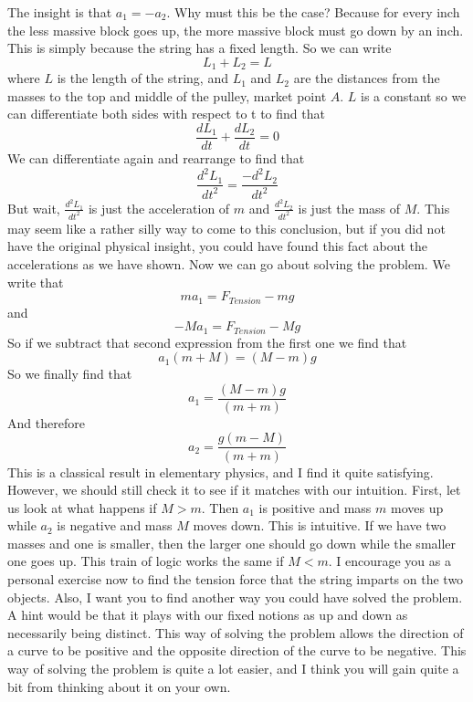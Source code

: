 \documentclass{article}[gray]
\numberwithin{equation}{subsection}
\begin{document}
The insight is that $a_1=-a_2$. Why must this be the case? Because for every inch the less massive block goes up, the more massive block must go down by an inch. This is simply because the string has a fixed length. So we can write \begin{equation}L_1+L_2=L\end{equation}where $L$ is the length of the string, and $L_1$ and $L_2$ are the distances from the masses to the top and middle of the pulley, market point $A$. $L$ is a constant so we can differentiate both sides with respect to t to find that \begin{equation}\frac{dL_1}{dt}+\frac{dL_2}{dt}=0\end{equation} We can differentiate again and rearrange to find that \begin{equation}\frac{d^2L_1}{dt^2}=\frac{-d^2L_2}{dt^2}\end{equation} But wait, $\frac{d^2L_1}{dt^2}$ is just the acceleration of $m$ and $\frac{d^2L_2}{dt^2}$ is just the mass of $M$. This may seem like a rather silly way to come to this conclusion, but if you did not have the original physical insight, you could have found this fact about the accelerations as we have shown. Now we can go about solving the problem. We write that $$ma_1=F_{Tension}-mg$$ and \begin{equation}-Ma_1=F_{Tension}-Mg\end{equation} So if we subtract that second expression from the first one we find that \begin{equation}a_1\left(m+M\right)=\left(M-m\right)g\end{equation} So we finally find that $$a_1=\frac{\left(M-m\right)g}{\left(m+m\right)}$$ And therefore $$a_2=\frac{g \left (m-M\right)}{\left(m+m\right)}$$ This is a classical result in elementary physics, and I find it quite satisfying. However, we should still check it to see if it matches with our intuition. First, let us look at what happens if $M>m$. Then $a_1$ is positive and mass $m$ moves up while $a_2$ is negative and mass $M$ moves down. This is intuitive. If we have two masses and one is smaller, then the larger one should go down while the smaller one goes up. This train of logic works the same if $M<m$. I encourage you as a personal exercise now to find the tension force that the string imparts on the two objects. Also, I want you to find another way you could have solved the problem. A hint would be that it plays with our fixed notions as up and down as necessarily being distinct. This way of solving the problem allows the direction of a curve to be positive and the opposite direction of the curve to be negative. This way of solving the problem is quite a lot easier, and I think you will gain quite a bit from thinking about it on your own. 
\clearpage
\end{document}
